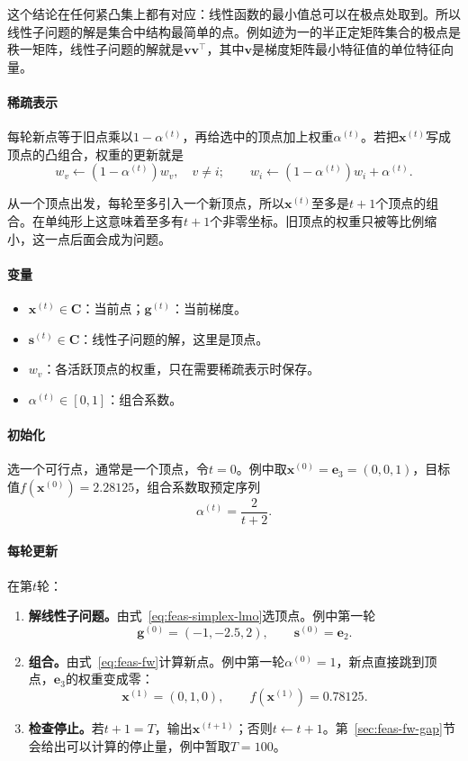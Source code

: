 这个结论在任何紧凸集上都有对应：线性函数的最小值总可以在极点处取到。所以线性子问题的解是集合中结构最简单的点。例如迹为一的半正定矩阵集合的极点是秩一矩阵，线性子问题的解就是$\bm{v}\bm{v}^\top$，其中$\bm{v}$是梯度矩阵最小特征值的单位特征向量。

\paragraph{稀疏表示}
每轮新点等于旧点乘以$1-\alpha^{(t)}$，再给选中的顶点加上权重$\alpha^{(t)}$。若把$\bm{x}^{(t)}$写成顶点的凸组合，权重的更新就是
\begin{equation}
 w_{v}\leftarrow(1-\alpha^{(t)})w_{v},\quad v\neq i;
 \qquad
 w_{i}\leftarrow(1-\alpha^{(t)})w_{i}+\alpha^{(t)}.
 \label{eq:feas-fw-weights}
\end{equation}

从一个顶点出发，每轮至多引入一个新顶点，所以$\bm{x}^{(t)}$至多是$t+1$个顶点的组合。在单纯形上这意味着至多有$t+1$个非零坐标。旧顶点的权重只被等比例缩小，这一点后面会成为问题。

\paragraph{变量}
\begin{itemize}
 \item $\bm{x}^{(t)}\in\bm{C}$：当前点；$\bm{g}^{(t)}$：当前梯度。
 \item $\bm{s}^{(t)}\in\bm{C}$：线性子问题的解，这里是顶点。
 \item $w_v$：各活跃顶点的权重，只在需要稀疏表示时保存。
 \item $\alpha^{(t)}\in[0,1]$：组合系数。
\end{itemize}

\paragraph{初始化}
选一个可行点，通常是一个顶点，令$t=0$。例中取$\bm{x}^{(0)}=\bm{e}_3=(0,0,1)$，目标值$f(\bm{x}^{(0)})=2.28125$，组合系数取预定序列
\begin{equation}
 \alpha^{(t)}=\frac{2}{t+2}.
 \label{eq:feas-fw-open-step}
\end{equation}

\paragraph{每轮更新}
在第$t$轮：
\begin{enumerate}
 \item \textbf{解线性子问题。}由式~\eqref{eq:feas-simplex-lmo}选顶点。例中第一轮
 \[
  \bm{g}^{(0)}=(-1,-2.5,2),\qquad \bm{s}^{(0)}=\bm{e}_2.
 \]
 \item \textbf{组合。}由式~\eqref{eq:feas-fw}计算新点。例中第一轮$\alpha^{(0)}=1$，新点直接跳到顶点，$\bm{e}_3$的权重变成零：
 \[
  \bm{x}^{(1)}=(0,1,0),\qquad f(\bm{x}^{(1)})=0.78125.
 \]
 \item \textbf{检查停止。}若$t+1=T$，输出$\bm{x}^{(t+1)}$；否则$t\leftarrow t+1$。第~\ref{sec:feas-fw-gap}节会给出可以计算的停止量，例中暂取$T=100$。
\end{enumerate}

